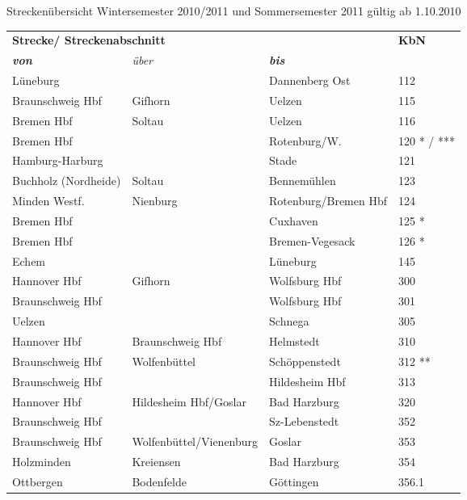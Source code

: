Streckenübersicht Wintersemester 2010/2011 und Sommersemester 2011 gültig ab 1.10.2010

\enlargethispage{0.5cm} 
 
\begin{tabular}{|l|l|l|p{2cm}|}
\hline
\multicolumn{3}{|l|}{\textbf{Strecke/ Streckenabschnitt}}& \textbf{KbN}\\
\textbf{\textit{von}} & \textit{über} & \textbf{\textit{bis}} & \\ \cline{ 1- 4}
Lüneburg &  & Dannenberg Ost & 112 \\ \hline
Braunschweig Hbf & Gifhorn & Uelzen & 115 \\ \hline
Bremen Hbf & Soltau & Uelzen & 116 \\ \hline
Bremen Hbf &  & Rotenburg/W. & 120 * / *** \\ \hline
Hamburg-Harburg &  & Stade & 121 \\ \hline
Buchholz (Nordheide) & Soltau & Bennemühlen & 123 \\ \hline
Minden Westf. & Nienburg & Rotenburg/Bremen Hbf & 124 \\ \hline
Bremen Hbf &  & Cuxhaven & 125 * \\ \hline
Bremen Hbf &  & Bremen-Vegesack & 126 * \\ \hline
Echem &  & Lüneburg & 145 \\ \hline
Hannover Hbf & Gifhorn & Wolfsburg Hbf & 300 \\ \hline
Braunschweig Hbf &  & Wolfsburg Hbf & 301 \\ \hline
Uelzen &  & Schnega & 305 \\ \hline
Hannover Hbf & Braunschweig Hbf & Helmstedt & 310 \\ \hline
Braunschweig Hbf & Wolfenbüttel & Schöppenstedt & 312 ** \\ \hline
Braunschweig Hbf &  & Hildesheim Hbf & 313 \\ \hline
Hannover Hbf & Hildesheim Hbf/Goslar & Bad Harzburg & 320 \\ \hline
Braunschweig Hbf &  & Sz-Lebenstedt & 352 \\ \hline
Braunschweig Hbf & Wolfenbüttel/Vienenburg & Goslar & 353 \\ \hline
Holzminden & Kreiensen & Bad Harzburg & 354 \\ \hline
Ottbergen & Bodenfelde & Göttingen & 356.1 \\ \hline

\end{tabular}
